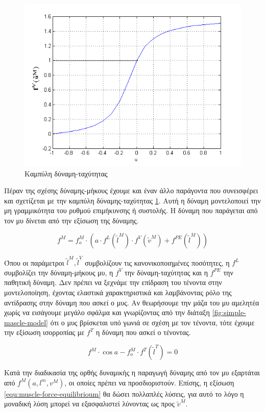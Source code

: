 \begin{figure}[H]
    \centering
    \includegraphics[width=.6\textwidth, keepaspectratio]{fig/force-velocity.png}
    \caption{Καμπύλη δύναμη-ταχύτητας}
    \label{fig:force-velocity}
\end{figure}

Πέραν της σχέσης δύναμης-μήκους έχουμε και έναν άλλο παράγοντα που συνεισφέρει και σχετίζεται με την καμπύλη δύναμης-ταχύτητας \ref{fig:force-velocity}. Αυτή η δύναμη μοντελοποιεί την μη γραμμικότητα του ρυθμού επιμήκυνσης ή συστολής. Η δύναμη που παράγεται από τον μυ δίνεται από την εξίσωση της δύναμης.

\begin{equation}
    f^{M} = f^{M}_{o} \cdot (a \cdot f^{L}(\tilde{l}^{M}) \cdot f^{V}(\tilde{v}^{M}) + f^{PE}(\tilde{l}^{M}))
    \label{equ:muscle-force}
\end{equation}

Όπου οι παράμετροι $\tilde{l}^{M}, \tilde{l}^{V}$ συμβολίζουν τις κανονικοποιημένες ποσότητες, η $f^{L}$ συμβολίζει την δύναμη-μήκους μυ, η $f^{V}$ την δύναμη-ταχύτητας και η $f^{PE}$ την παθητική δύναμη. Δεν πρέπει να ξεχνάμε την επίδραση του τένοντα στην μοντελοποίηση, έχοντας ελαστικά χαρακτηριστικά και λαμβάνοντας ρόλο της αντίδρασης στην δύναμη που ασκεί ο μυς. Αν θεωρήσουμε την μάζα του μυ αμελητέα χωρίς να εισάγουμε μεγάλο σφάλμα και γνωρίζοντας από την διάταξη \ref{fig:simple-mascle-model} ότι ο μυς βρίσκεται υπό γωνιά  σε σχέση με τον τένοντα, τότε έχουμε την εξίσωση ισορροπίας με $f^{T}$ η δύναμη που ασκεί ο τένοντας.

\begin{equation}
    f^{M} \cdot \cos{a} - f^{M}_{o} \cdot f^{T}(\tilde{l}^{T}) = 0
    \label{equ:muscle-force-equilibrioum}
\end{equation}

Κατά την διαδικασία της ορθής δυναμικής η παραγωγή δύναμης από τον μυ εξαρτάται από $f^{M}(a, l^{m}, v^{M})$, οι οποίες πρέπει να προσδιοριστούν. Επίσης, η εξίσωση \ref{equ:muscle-force-equilibrioum} θα δώσει πολλαπλές λύσεις, για αυτό το λόγο η μοναδική λύση μπορεί να εξασφαλιστεί λύνοντας ως προς $\tilde{v}^{M}$.

